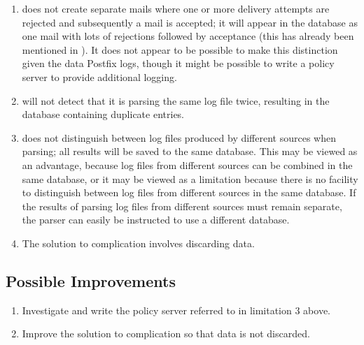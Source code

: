 \begin{enumerate}
    \item \parsername{} does not create separate mails where one or more
        delivery attempts are rejected and subsequently a mail is accepted;
        it will appear in the database as one mail with lots of rejections
        followed by acceptance (this has already been mentioned in
        ).  It does not appear to be possible
        to make this distinction given the data Postfix logs, though it
        might be possible to write a policy server to provide additional
        logging.

    \item \parsername{} will not detect that it is parsing the same log file
        twice, resulting in the database containing duplicate entries.

    \item \parsername{} does not distinguish between log files produced by
        different sources when parsing; all results will be saved to the
        same database.  This may be viewed as an advantage, because log
        files from different sources can be combined in the same database,
        or it may be viewed as a limitation because there is no facility to
        distinguish between log files from different sources in the same
        database.  If the results of parsing log files from different
        sources must remain separate, the parser can easily be instructed
        to use a different database.

    \item The solution to complication  involves discarding data.

\end{enumerate}

\subsection{Possible Improvements}

\begin{enumerate}

    \item Investigate and write the policy server referred to in limitation
        3 above.

    \item Improve the solution to complication  so that data is not discarded.

\end{enumerate}


